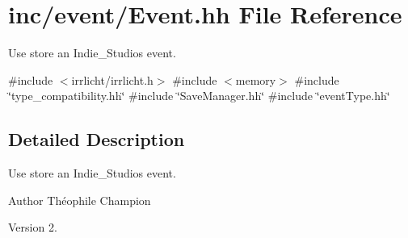 \hypertarget{Event_8hh}{}\section{inc/event/\+Event.hh File Reference}
\label{Event_8hh}


Use store an Indie\+\_\+\+Studio\textquotesingle{}s event.  


{\ttfamily \#include $<$irrlicht/irrlicht.\+h$>$}\newline
{\ttfamily \#include $<$memory$>$}\newline
{\ttfamily \#include \char`\"{}type\+\_\+compatibility.\+hh\char`\"{}}\newline
{\ttfamily \#include \char`\"{}Save\+Manager.\+hh\char`\"{}}\newline
{\ttfamily \#include \char`\"{}event\+Type.\+hh\char`\"{}}\newline


\subsection{Detailed Description}
Use store an Indie\+\_\+\+Studio\textquotesingle{}s event. 

\begin{DoxyAuthor}{Author}
Théophile Champion 
\end{DoxyAuthor}
\begin{DoxyVersion}{Version}
2. 
\end{DoxyVersion}
